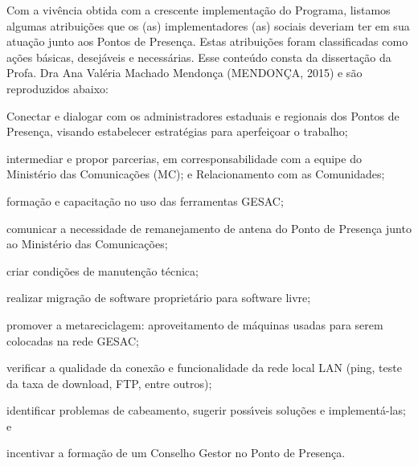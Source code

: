 \documentclass[
12pt,		%
openright,	%
twoside,  %
a4paper,			%
chapter=TITLE,		%
english,			%
french,				%
spanish,			%
brazil				%
]{USPSC-classe/USPSC}
\begin{document}
\noindent\begin{center}\mbox{\centering{}}\end{center}


Com a viv\^encia obtida com a crescente implementa\c{c}\~ao do Programa, listamos  algumas atribui\c{c}\~oes que os (as) implementadores (as) sociais deveriam ter em sua atua\c{c}\~ao junto aos Pontos de Presen\c{c}a. Estas atribui\c{c}\~oes foram classificadas como a\c{c}\~oes b\'asicas, desej\'aveis e necess\'arias. Esse conte\'udo consta da disserta\c{c}\~ao da Profa. Dra Ana Val\'eria Machado Mendon\c{c}a  (MENDON\c{C}A, 2015) e s\~ao reproduzidos abaixo:


















\begin{alineas}
\item Conectar e dialogar com os administradores estaduais e regionais dos Pontos de Presen\c{c}a, visando estabelecer estrat\'egias para aperfei\c{c}oar o trabalho;
\item intermediar e propor parcerias, em corresponsabilidade com a equipe do Minist\'erio das Comunica\c{c}\~oes (MC); e Relacionamento com as Comunidades;
\item forma\c{c}\~ao e capacita\c{c}\~ao no uso das ferramentas GESAC;
\item comunicar a  necessidade de remanejamento de antena  do Ponto de Presen\c{c}a junto ao Minist\'erio das Comunica\c{c}\~oes;
\item criar condi\c{c}\~oes de manuten\c{c}\~ao t\'ecnica;
\item realizar migra\c{c}\~ao de software propriet\'ario para software livre;
\item promover a metareciclagem: aproveitamento de m\'aquinas usadas para serem colocadas na rede GESAC;
\item verificar a qualidade da conex\~ao e  funcionalidade da rede local LAN (ping, teste da taxa de download, FTP, entre outros);
\item identificar problemas de cabeamento, sugerir poss\'{\i}veis solu\c{c}\~oes e implement\'a-las; e
\item incentivar a forma\c{c}\~ao de um Conselho Gestor no Ponto de Presen\c{c}a.
\end{alineas}
\end{document}
